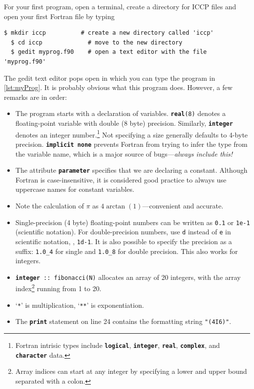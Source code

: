 \documentclass[openany,oneside]{report}
\newcommand{\keyword}[1]{\texttt{\bfseries\color{DarkRed}#1}}
\newcommand{\str}[1]{\texttt{\color{Magenta}#1}}
\begin{document}
For your first program, open a terminal, create a directory for ICCP files and open your first Fortran file by typing
\begin{lstlisting}[style=prompt, nolol]
  $ mkdir iccp          # create a new directory called 'iccp'
  $ cd iccp             # move to the new directory
  $ gedit myprog.f90    # open a text editor with the file 'myprog.f90'
\end{lstlisting}
The gedit text editor pops open in which you can type the program in \autoref{lst:myProg}.
It is probably obvious what this program does. However, a few remarks are in order:
\begin{itemize}
  \item The program starts with a declaration of variables.
    \texttt{\keyword{real}(8)} denotes a floating-point variable with double (8 byte) precision. 
    Similarly, \keyword{integer} denotes an integer number.\footnote{Fortran intrisic types include \keyword{logical}, \keyword{integer}, \keyword{real}, \keyword{complex}, and \keyword{character} data.}
    Not specifying a size generally defaults to 4-byte precision.
    \keyword{implicit none} prevents Fortran from trying to infer the type from the variable name, which is a major source of bugs---\emph{always include this!}
  \item The attribute \keyword{parameter} specifies that we are declaring a constant.
    Although Fortran is case-insensitive, it is considered good practice to always use uppercase names for constant variables.
  \item Note the calculation of $\pi$ as $4\arctan(1)$---convenient and accurate.
  \item Single-precision (4 byte) floating-point numbers can be written as \texttt{0.1} or \texttt{1e-1} (scientific notation). 
    For double-precision numbers, use \texttt{d} instead of \texttt{e} in scientific notation, \eg, \texttt{1d-1}. 
    It is also possible to specify the precision as a suffix: \texttt{1.0\_4} for single and \texttt{1.0\_8} for double precision. 
    This also works for integers.
  \item \texttt{\keyword{integer} :: fibonacci(N)} allocates an array of 20 
    integers, with the array index\footnote{Array indices can start at 
    any integer by specifying a lower and upper bound separated with a colon.} running from 1 to 20.
  \item `\texttt{*}' is multiplication, `\texttt{**}' is exponentiation.
  \item The \keyword{print} statement on line 24 contains the formatting string \str{"(4I6)"}. 

\end{itemize}
\end{document}
